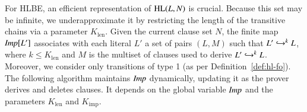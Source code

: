 % 
% 
For HLBE, an efficient representation of $\HL(L,N)$ is crucial. Because
this set may be infinite, we underapproximate it by
restricting the length of the
transitive chains via a parameter $K_\mathrm{len}$. Given the current
clause set $N$, the finite map $\impmap[L']$ associates with each literal $L'$
a set of pairs $(L,M)$ such that $L' \bigfimpl{N}^k L$, where $k \leq
K_\mathrm{len}$ and $M$ is the multiset of clauses used to derive $L' \bigfimpl{N}^k L$.
Moreover, we consider only transitions of type 1 (as per
Definition~\ref{def:hl-fo}).
The following algorithm
maintains $\impmap$ dynamically, updating it as the prover derives and deletes
clauses.
It depends on the global variable $\impmap$ and the parameters
$K_\mathrm{len}$ and $K_{\mathrm{imp}}$.



\newcommand{\vn}[1]{\ensuremath{\mathit{#1}}} %
\algrenewcommand{}
\algrenewcommand\algorithmicindent{0.75em}


